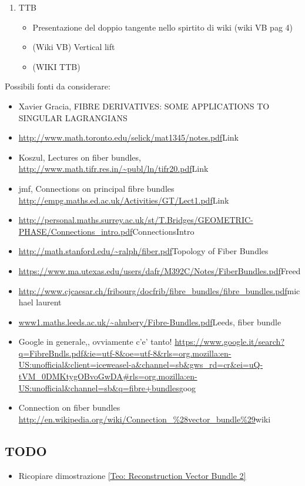 \documentclass[a4paper,12pt]{scrartcl}    %
\begin{document}
\begin{proposition}
\begin{enumerate}
\item TTB
	\begin{itemize}
		 \item Presentazione del doppio tangente nello spirtito di wiki (wiki VB pag 4)
		 \item (Wiki VB) Vertical lift
		 \item (WIKI TTB)
	\end{itemize}
\end{enumerate}

\vspace{8mm}
Possibili fonti da considerare:
\begin{itemize}
	\item Xavier Gracia, FIBRE DERIVATIVES: SOME APPLICATIONS TO SINGULAR LAGRANGIANS 
	\item \url{http://www.math.toronto.edu/selick/mat1345/notes.pdf}{Link}
	\item Koszul, Lectures on fiber bundles, \url{http://www.math.tifr.res.in/~publ/ln/tifr20.pdf}{Link}
	\item jmf, Connections on principal fibre bundles \url{http://empg.maths.ed.ac.uk/Activities/GT/Lect1.pdf}{Link}
	\item \url{http://personal.maths.surrey.ac.uk/st/T.Bridges/GEOMETRIC-PHASE/Connections_intro.pdf}{ConnectionsIntro}
	\item \url{http://math.stanford.edu/~ralph/fiber.pdf}{Topology of Fiber Bundles}
	\item \url{https://www.ma.utexas.edu/users/dafr/M392C/Notes/FiberBundles.pdf}{Freed}
	\item \url{http://www.cjcaesar.ch/fribourg/docfrib/fibre_bundles/fibre_bundles.pdf}{michael laurent}
	\item \url{www1.maths.leeds.ac.uk/~ahubery/Fibre-Bundles.pdf}{Leeds, fiber bundle}
	\item Google in generale,, ovviamente c'e' tanto! \url{https://www.google.it/search?q=FibreBndls.pdf&ie=utf-8&oe=utf-8&rls=org.mozilla:en-US:unofficial&client=iceweasel-a&channel=sb&gws_rd=cr&ei=uQ-tVM_0DMKtygOBvoGwDA#rls=org.mozilla:en-US:unofficial&channel=sb&q=fibre+bundles}{goog}	
	\item Connection on fiber bundles \url{http://en.wikipedia.org/wiki/Connection_%28vector_bundle%29}{wiki}	
	
\end{itemize}

\subsection{TODO}
\begin{itemize}
\item Ricopiare dimostrazione \ref{Teo: Reconstruction Vector Bundle 2}


\end{itemize}
\end{proposition}
\end{document}
